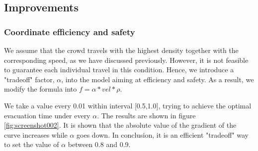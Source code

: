 \documentclass{mcmthesis}
\begin{document}
	\subsection{Improvements}
	
	\subsubsection{Coordinate efficiency and safety}
	We assume that the crowd travels with the highest density together with the corresponding speed, as we have discussed previously. However, it is not feasible to guarantee each individual travel in this condition. Hence, we introduce a "tradeoff" factor, $\alpha$, into the model aiming at efficiency and safety. As a result, we modify the formula into
	$f=\alpha * vel * \rho$. 
	
	We take a value every 0.01 within interval [0.5,1.0], trying to achieve the optimal evacuation time under every $\alpha$. The results are shown in figure \ref{fig:screenshot002}. It is shown that the absolute value of the gradient of the curve increases while $\alpha$ goes down. In conclusion, it is an efficient "tradeoff" way to set the value of $\alpha$ between 0.8 and 0.9.
	
	\begin{figure} 
		\centering 
		\hspace{0.2in} 
	\end{figure}
	
\end{document}
